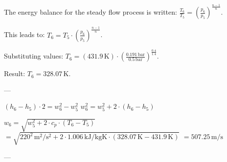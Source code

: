 The energy balance for the steady flow process is written:  
\( \frac{T_6}{T_5} = \left( \frac{p_6}{p_5} \right)^{\frac{n-1}{n}} \).  

This leads to:  
\( T_6 = T_5 \cdot \left( \frac{p_6}{p_5} \right)^{\frac{n-1}{n}} \).  

Substituting values:  
\( T_6 = (431.9 \, \text{K}) \cdot \left( \frac{0.191 \, \text{bar}}{0.5 \, \text{bar}} \right)^{\frac{0.4}{1.4}} \).  

Result:  
\( T_6 = 328.07 \, \text{K} \).  

---

\( (h_6 - h_5) \cdot 2 = w_6^2 - w_5^2 \)  
\( w_6^2 = w_5^2 + 2 \cdot (h_6 - h_5) \)  

\( w_6 = \sqrt{w_5^2 + 2 \cdot c_p \cdot (T_6 - T_5)} \)  
\( = \sqrt{220^2 \, \text{m}^2/\text{s}^2 + 2 \cdot 1.006 \, \text{kJ}/\text{kgK} \cdot (328.07 \, \text{K} - 431.9 \, \text{K})} \)  
\( = 507.25 \, \text{m}/\text{s} \)  

---